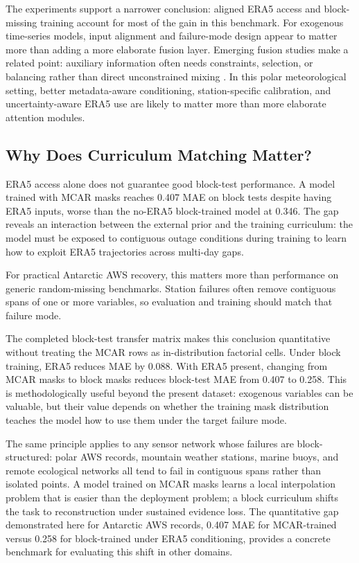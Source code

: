 The experiments support a narrower conclusion: aligned ERA5 access and block-missing training account for most of the gain in this benchmark. For exogenous time-series models, input alignment and failure-mode design appear to matter more than adding a more elaborate fusion layer. Emerging fusion studies make a related point: auxiliary information often needs constraints, selection, or balancing rather than direct unconstrained mixing \citep{lee2026constrainedfusion,cao2026ecto,chen2025exost}. In this polar meteorological setting, better metadata-aware conditioning, station-specific calibration, and uncertainty-aware ERA5 use are likely to matter more than more elaborate attention modules.

\subsection{Why Does Curriculum Matching Matter?}
ERA5 access alone does not guarantee good block-test performance. A model trained with MCAR masks reaches 0.407 MAE on block tests despite having ERA5 inputs, worse than the no-ERA5 block-trained model at 0.346. The gap reveals an interaction between the external prior and the training curriculum: the model must be exposed to contiguous outage conditions during training to learn how to exploit ERA5 trajectories across multi-day gaps.

For practical Antarctic AWS recovery, this matters more than performance on generic random-missing benchmarks. Station failures often remove contiguous spans of one or more variables, so evaluation and training should match that failure mode.

The completed block-test transfer matrix makes this conclusion quantitative without treating the MCAR rows as in-distribution factorial cells. Under block training, ERA5 reduces MAE by 0.088. With ERA5 present, changing from MCAR masks to block masks reduces block-test MAE from 0.407 to 0.258. This is methodologically useful beyond the present dataset: exogenous variables can be valuable, but their value depends on whether the training mask distribution teaches the model how to use them under the target failure mode.

The same principle applies to any sensor network whose failures are block-structured: polar AWS records, mountain weather stations, marine buoys, and remote ecological networks all tend to fail in contiguous spans rather than isolated points. A model trained on MCAR masks learns a local interpolation problem that is easier than the deployment problem; a block curriculum shifts the task to reconstruction under sustained evidence loss. The quantitative gap demonstrated here for Antarctic AWS records, 0.407 MAE for MCAR-trained versus 0.258 for block-trained under ERA5 conditioning, provides a concrete benchmark for evaluating this shift in other domains.

